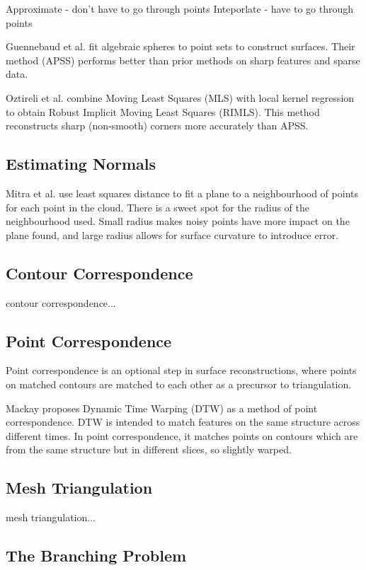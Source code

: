 \documentclass[acmsmall, 12pt]{acmart}
\begin{document}
Approximate - don't have to go through points
Inteporlate - have to go through points

Guennebaud et al. \cite{guennebaud2007algebraic} fit algebraic spheres to point sets to construct surfaces. Their method (APSS) performs better than prior methods on sharp features and sparse data.

Oztireli et al. \cite{oztireli2009feature} combine Moving Least Squares (MLS) with local kernel regression to obtain Robust Implicit Moving Least Squares (RIMLS). This method reconstructs sharp (non-smooth) corners more accurately than APSS.

\subsection{Estimating Normals}

Mitra et al. \cite{mitra2003estimating} use least squares distance to fit a plane to a neighbourhood of points for each point in the cloud. There is a sweet spot for the radius of the neighbourhood used. Small radius makes noisy points have more impact on the plane found, and large radius allows for surface curvature to introduce error. 

\subsection{Contour Correspondence}
contour correspondence...

\subsection{Point Correspondence}
Point correspondence is an optional step in surface reconstructions, where points on matched contours are matched to each other as a precursor to triangulation.

Mackay \cite{mackay2019robust} proposes Dynamic Time Warping (DTW) as a method of point correspondence. DTW is intended to match features on the same structure across different times. In point correspondence, it matches points on contours which are from the same structure but in different slices, so slightly warped. 

\subsection{Mesh Triangulation}
mesh triangulation...

\subsection{The Branching Problem}
\end{document}
